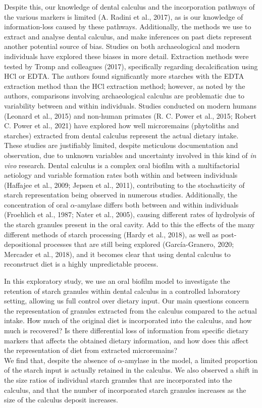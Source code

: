 \documentclass[
  letterpaper,
]{book}
\begin{document}
Despite this, our knowledge of dental calculus and the incorporation
pathways of the various markers is limited (A. Radini et al., 2017), as
is our knowledge of information-loss caused by these pathways.
Additionally, the methods we use to extract and analyse dental calculus,
and make inferences on past diets represent another potential source of
bias. Studies on both archaeological and modern individuals have
explored these biases in more detail. Extraction methods were tested by
Tromp and colleagues (2017), specifically regarding decalcification
using HCl or EDTA. The authors found significantly more starches with
the EDTA extraction method than the HCl extraction method; however, as
noted by the authors, comparisons involving archaeological calculus are
problematic due to variability between and within individuals. Studies
conducted on modern humans (Leonard et al., 2015) and non-human primates
(R. C. Power et al., 2015; Robert C. Power et al., 2021) have explored
how well microremains (phytoliths and starches) extracted from dental
calculus represent the actual dietary intake. These studies are
justifiably limited, despite meticulous documentation and observation,
due to unknown variables and uncertainty involved in this kind of
\emph{in vivo} research. Dental calculus is a complex oral biofilm with
a multifactorial aetiology and variable formation rates both within and
between individuals (Haffajee et al., 2009; Jepsen et al., 2011),
contributing to the stochasticity of starch representation being
observed in numerous studies. Additionally, the concentration of oral
\(\alpha\)-amylase differs both between and within individuals
(Froehlich et al., 1987; Nater et al., 2005), causing different rates of
hydrolysis of the starch granules present in the oral cavity. Add to
this the effects of the many different methods of starch processing
(Hardy et al., 2018), as well as post-depositional processes that are
still being explored (García-Granero, 2020; Mercader et al., 2018), and
it becomes clear that using dental calculus to reconstruct diet is a
highly unpredictable process.

In this exploratory study, we use an oral biofilm model to investigate
the retention of starch granules within dental calculus in a controlled
laboratory setting, allowing us full control over dietary input. Our
main questions concern the representation of granules extracted from the
calculus compared to the actual intake. How much of the original diet is
incorporated into the calculus, and how much is recovered? Is there
differential loss of information from specific dietary markers that
affects the obtained dietary information, and how does this affect the
representation of diet from extracted microremains?\\
We find that, despite the absence of \(\alpha\)-amylase in the model, a
limited proportion of the starch input is actually retained in the
calculus. We also observed a shift in the size ratios of individual
starch granules that are incorporated into the calculus, and that the
number of incorporated starch granules increases as the size of the
calculus deposit increases.
\end{document}
